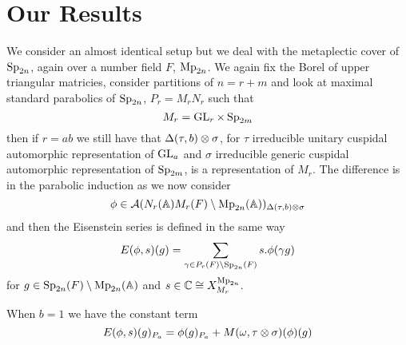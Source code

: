 \section{Our Results}
We consider an almost identical setup but we deal with the metaplectic cover of \(\operatorname{Sp}_{2n}\), again over a number field \(F\), \(\operatorname{Mp}_{2n}\). We again fix the Borel of upper triangular matricies, consider partitions of \(n = r+m\) and look at maximal standard parabolics of \(\operatorname{Sp}_{2n}\), \(P_r = M_rN_r\) such that 
\[M_r = \operatorname{GL}_r \times \operatorname{Sp}_{2m}\]
then if \(r = ab\) we still have that \(\Delta(\tau, b)\otimes \sigma\), for \(\tau\) irreducible unitary cuspidal automorphic representation of \(\operatorname{GL}_a\) and \(\sigma\) irreducible generic cuspidal automorphic representation of \(\operatorname{Sp}_{2m}\), is a representation of \(M_r\). The difference is in the parabolic induction as we now consider 
\[\phi\in \mathcal{A}(N_r(\A)M_r(F)\setminus \Mp_{2n}(\A) )_{\Delta(\tau, b)\tensor \sigma}\] 
and then the Eisenstein series is defined in the same way
\[E(\phi, s)(g) = \sum_{\gamma\in P_r(F) \setminus \Sp_{2n}(F)} s.\phi(\gamma g)\]
for \(g\in \Sp_{2n}(F) \setminus \Mp_{2n}(\A)\) and \(s\in \C \cong X^{\Mp_{2n}}_{M_r}\).

\begin{Lemma}
When \(b = 1\) we have the constant term
    \[E(\phi,s)(g)_{P_a} = \phi(g)_{P_a} + M(\omega, \tau\tensor\sigma)(\phi)(g)\]
\end{Lemma}


